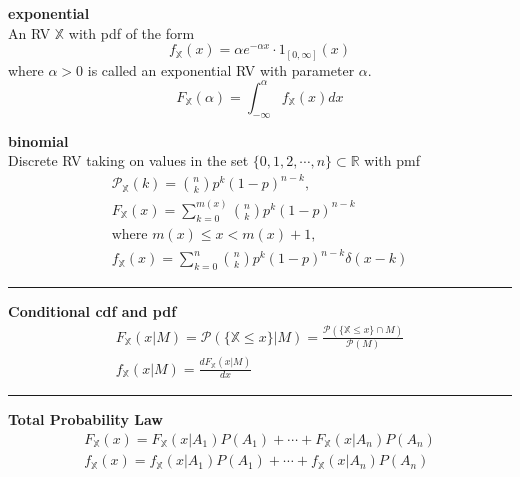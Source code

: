 \documentclass{article}
\renewcommand{\P}{\mathcal{P}}
\providecommand{\X}{\mathbb{X}}
\providecommand{\R}{\mathbb{R}}
\begin{document}
\begin{multicols*}{3}
        \textbf{exponential}\\
        An RV $\X$ with pdf of the form
        \begin{equation*}
            f_{\X}(x)=\alpha e^{-\alpha x}\cdot 1_{[0,\infty]}(x)
        \end{equation*}
        where $\alpha>0$ is called an exponential RV with parameter $\alpha$.
        \begin{equation*}
            F_{\X}(\alpha) = \int_{-\infty}^{\alpha} f_{\X}(x)dx
        \end{equation*}

        \textbf{binomial}\\
        Discrete RV taking on values in the set $\{0,1,2,\cdots,n\}\subset\R$ with pmf
        \begin{equation*}
            \begin{gathered}
                \P_{\X}(k)={n\choose k}p^k(1-p)^{n-k},\\
                F_{\X}(x)= \sum_{k=0}^{m(x)} {n\choose k}p^k(1-p)^{n-k}\\
                \text{where } m(x)\leq x< m(x)+1,\\
                f_{\X}(x) = \sum_{k=0}^{n} {n\choose k}p^k(1-p)^{n-k}\delta(x-k)
            \end{gathered}
        \end{equation*}

        \noindent\rule{\columnwidth}{0.4pt}

        \textbf{Conditional cdf and pdf}
        \begin{equation*}
            \begin{gathered}
                F_{\X}(x|M)=\P(\{\X\leq x\}|M) = \frac{\P(\{\X\leq x\}\cap M)}{\P(M)}\\
                f_{\X}(x|M) = \frac{dF_\X(x|M)}{dx}
            \end{gathered}
        \end{equation*}

        \noindent\rule{\columnwidth}{0.4pt}

        \textbf{Total Probability Law}
        \begin{equation*}
            \begin{gathered}
                F_{\X}(x)=F_{\X}(x|A_1)P(A_1)+\cdots+F_{\X}(x|A_n)P(A_n)\\
                f_{\X}(x)=f_{\X}(x|A_1)P(A_1)+\cdots+f_{\X}(x|A_n)P(A_n)
            \end{gathered}
        \end{equation*}


\end{multicols*}
\end{document}
